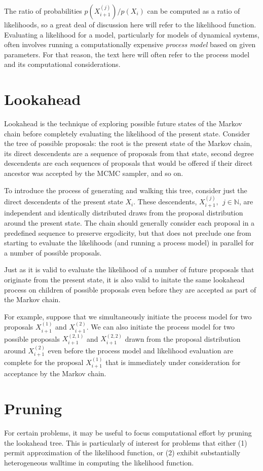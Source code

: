 \documentclass[10pt]{article}
\begin{document}
The ratio of probabilities $p(X_{i+1}^{(j)}) / p(X_{i})$ can be computed as a ratio of likelihoods, so a great deal of discussion here will refer to the likelihood function.
Evaluating a likelihood for a model, particularly for models of dynamical systems, often involves running a computationally expensive \emph{process model} based on given parameters.
For that reason, the text here will often refer to the process model and its computational considerations.

\section{Lookahead}
Lookahead is the technique of exploring possible future states of the Markov chain before completely evaluating the likelihood of the present state.
Consider the tree of possible proposals: the root is the present state of the Markov chain, its direct descendents are a sequence of proposals from that state, second degree descendents are each sequences of proposals that would be offered if their direct ancestor was accepted by the MCMC sampler, and so on.

To introduce the process of generating and walking this tree, consider just the direct descendents of the present state $X_i$.
These descendents, $X_{i+1}^{(j)}, ~~ j \in \mathbb{N}$, are independent and identically distributed draws from the proposal distribution around the present state.
The chain should generally consider each proposal in a predefined sequence to preserve ergodicity, but that does not preclude one from starting to evaluate the likelihoods (and running a process model) in parallel for a number of possible proposals.

Just as it is valid to evaluate the likelihood of a number of future proposals that originate from the present state, it is also valid to initate the same lookahead process on children of possible proposals even before they are accepted as part of the Markov chain.

For example, suppose that we simultaneously initiate the process model for two proposals $X_{i+1}^{(1)}$ and $X_{i+1}^{(2)}$.
We can also initiate the process model for two possible proposals $X_{i+1}^{(2,1)}$ and $X_{i+1}^{(2,2)}$ drawn from the proposal distribution around $X_{i+1}^{(2)}$ even before the process model and likelihood evaluation are complete for the proposal $X_{i+1}^{(1)}$ that is immediately under consideration for acceptance by the Markov chain.

\section{Pruning}
For certain problems, it may be useful to focus computational effort by pruning the lookahead tree.
This is particularly of interest for problems that either (1) permit approximation of the likelihood function, or (2) exhibit substantially heterogeneous walltime in computing the likelihood function.
\end{document}
